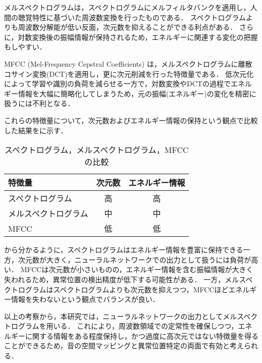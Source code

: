 \documentclass[../main]{subfiles}
\begin{document}
メルスペクトログラムは，スペクトログラムにメルフィルタバンクを適用し，人間の聴覚特性に基づいた周波数変換を行ったものである． スペクトログラムよりも周波数分解能が低い反面，次元数を抑えることができる利点がある． さらに，対数変換後の振幅情報が保持されるため，エネルギーに関連する変化の把握もしやすい．

MFCC (Mel-Frequency Cepstral Coefficients) は，メルスペクトログラムに離散コサイン変換(DCT)を適用し，更に次元削減を行った特徴量である． 低次元化によって学習や識別の負荷を減らせる一方で，対数変換やDCTの過程でエネルギー情報を大幅に簡略化してしまうため，元の振幅(エネルギー)の変化を精密に扱うには不利となる．

これらの特徴量について，次元数およびエネルギー情報の保持という観点で比較した結果をに示す．
\begin{table}[h]
  \centering
  \caption{スペクトログラム，メルスペクトログラム，MFCCの比較}
  \label{tab:feature_comparison}
  \begin{tabular}{lcc}
      \hline
      \textbf{特徴量} & \textbf{次元数} & \textbf{エネルギー情報} \\
      \hline
      スペクトログラム & 高 & 高 \\
      メルスペクトログラム & 中 & 中 \\
      MFCC & 低 & 低 \\
      \hline
  \end{tabular}
\end{table}

から分かるように，スペクトログラムはエネルギー情報を豊富に保持できる一方，次元数が大きく，ニューラルネットワークでの出力として扱うには負荷が高い． MFCCは次元数が小さいものの，エネルギー情報を含む振幅情報が大きく失われるため，異常位置の検出精度が低下する可能性がある． 一方，メルスペクトログラムはスペクトログラムよりも次元数を抑えつつ，MFCCほどエネルギー情報を失わないという観点でバランスが良い．

以上の考察から，本研究では，ニューラルネットワークの出力としてメルスペクトログラムを用いる． これにより，周波数領域での定常性を確保しつつ，エネルギーに関する情報をある程度保持し，かつ過度に高次元ではない特徴量を得ることができるため，音の空間マッピングと異常位置特定の両面で有効と考えられる．
\end{document}
